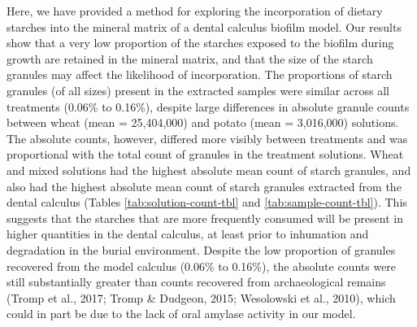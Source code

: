 \documentclass[
]{article}
\begin{document}
Here, we have provided a method for exploring the incorporation of dietary
starches into the mineral matrix of a dental calculus biofilm model. Our results show
that a very low proportion of the starches exposed to the biofilm during growth are
retained in the mineral matrix, and that the size of the starch granules
may affect the likelihood of incorporation. The proportions of starch granules
(of all sizes) present in the extracted samples were similar across all treatments
(0.06\% to 0.16\%),
despite large differences in absolute granule counts between wheat
(mean = 25,404,000)
and potato
(mean = 3,016,000)
solutions.\\
The absolute counts, however, differed more visibly between treatments and was
proportional with the total count of granules in the treatment solutions. Wheat
and mixed solutions had the highest absolute mean count of starch granules, and
also had the highest absolute mean count of starch granules extracted from the
dental calculus
(Tables \ref{tab:solution-count-tbl} and \ref{tab:sample-count-tbl}).
This suggests that the starches that are more frequently consumed will be present
in higher quantities in the dental calculus, at least prior to inhumation and
degradation in the burial environment.
Despite the low proportion of granules recovered from the model calculus
(0.06\% to 0.16\%),
the absolute counts were still substantially greater than counts recovered from
archaeological remains
(Tromp et al., 2017; Tromp \& Dudgeon, 2015; Wesolowski et al., 2010), which could in part be due to the
lack of oral amylase activity in our model.
\end{document}
